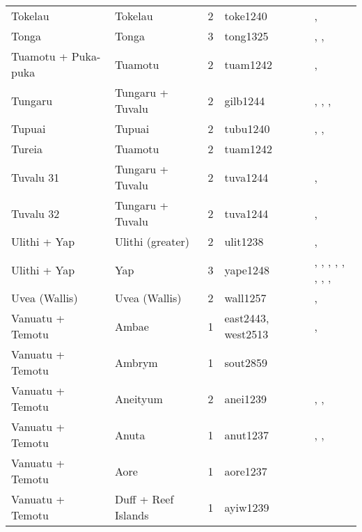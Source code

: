 \begin{longtable}{p{4.5cm}p{2cm}p{2cm}p{2cm}p{4cm}}
  Tokelau & Tokelau & 2 & toke1240 & \citet{hooper1973demographic}, \citet{macgregor1937} \\ 
  Tonga & Tonga & 3 & tong1325 & \citet{kirch1984evolution}, \citet{cummins1977tongan}, \citet{ferdon1988early} \\ 
  Tuamotu + Puka-puka & Tuamotu & 2 & tuam1242 & \citet{emory1975material}, \citet{emory1975material} \\ 
  Tungaru & Tungaru + Tuvalu & 2 & gilb1244 & \citet{lambert1966}, \citet{lambert1975makin}, \citet{lambert1991}, \citet{macdonald1982cinderellas} \\ 
  Tupuai & Tupuai & 2 & tubu1240 & \citet{aitken1930ethnology}, \citet{bollt2008excavations}, \citet{edwards2003archaeological} \\ 
  Tureia & Tuamotu & 2 & tuam1242 & \citet{emory1975material} \\ 
  Tuvalu 31 & Tungaru + Tuvalu & 2 & tuva1244 & \citet{macdonald1982cinderellas}, \citet{goldsmith1991} \\ 
  Tuvalu 32 & Tungaru + Tuvalu & 2 & tuva1244 & \citet{macdonald1982cinderellas}, \citet{goldsmith1991} \\ 
  Ulithi + Yap & Ulithi (greater) & 2 & ulit1238 & \citet{lessa1950}, \citet{lessa1966} \\ 
  Ulithi + Yap & Yap & 3 & yape1248 & \citet{huntetal1949}, \citet{muller1917}, \citet{murdocketal1944b}, \citet{salesius1906}, \citet{schneider1953}, \citet{schneider1957_yap}, \citet{schneider1962}, \citet{tetens_savages}, \citet{tetensandkubary1873} \\ 
  Uvea (Wallis) & Uvea (Wallis) & 2 & wall1257 & \citet{burrows1937}, \citet{pollock1995power} \\ 
  Vanuatu + Temotu & Ambae & 1 & east2443, west2513 & \citet{bonnemaison1972systeme}, \citet{bonnemaison1972systeme} \\ 
  Vanuatu + Temotu & Ambrym & 1 & sout2859 & \citet{tonkinson1981church} \\ 
  Vanuatu + Temotu & Aneityum & 2 & anei1239 & \citet{humphreys1926}, \citet{spriggs1982taro}, \citet{spriggs1986landscape} \\ 
  Vanuatu + Temotu & Anuta & 1 & anut1237 & \citet{feinberg1988socio}, \citet{feinberg1991}, \citet{kirch2002te} \\ 
  Vanuatu + Temotu & Aore & 1 & aore1237 & \citet{bonnemaison1996power} \\ 
  Vanuatu + Temotu & Duff + Reef Islands & 1 & ayiw1239 & \citet{davenport1969} \\ 

\end{longtable}
